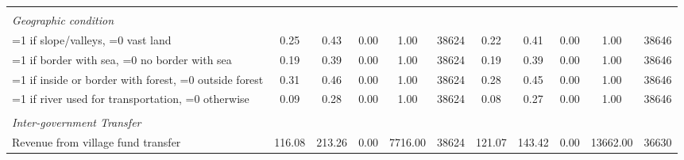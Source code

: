 \begin{tabular}{l*{2}{ccccc}}
\vspace{0.05em} \\ \emph{Geographic condition}&         &         &         &         &         &         &         &         &         &         \\
\hspace{0.25cm} =1 if slope/valleys, =0 vast land&     0.25&     0.43&     0.00&     1.00&    38624&     0.22&     0.41&     0.00&     1.00&    38646\\
\hspace{0.25cm} =1 if border with sea, =0 no border with sea&     0.19&     0.39&     0.00&     1.00&    38624&     0.19&     0.39&     0.00&     1.00&    38646\\
\hspace{0.25cm} =1 if inside or border with forest, =0 outside forest&     0.31&     0.46&     0.00&     1.00&    38624&     0.28&     0.45&     0.00&     1.00&    38646\\
\hspace{0.25cm} =1 if river used for transportation, =0 otherwise&     0.09&     0.28&     0.00&     1.00&    38624&     0.08&     0.27&     0.00&     1.00&    38646\\
\vspace{0.05em} \\ \emph{Inter-government Transfer}&         &         &         &         &         &         &         &         &         &         \\
\hspace{0.25cm} Revenue from village fund transfer&   116.08&   213.26&     0.00&  7716.00&    38624&   121.07&   143.42&     0.00& 13662.00&    36630\\
\bottomrule
\end{tabular}

